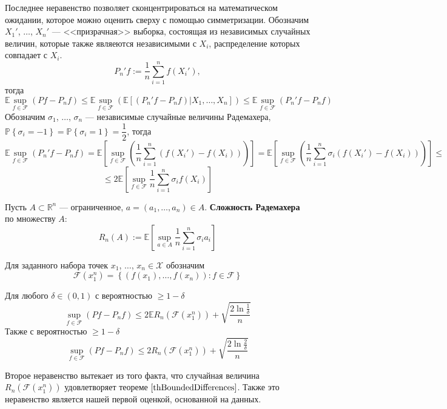 \documentclass[12pt]{article}
\newtheorem{theorem}{\hskip\parindent Теорема}%
\begin{document}
Последнее неравенство позволяет сконцентрироваться на математическом ожидании, которое можно оценить сверху с помощью симметризации. Обозначим $X_1'$, $\dots$, $X_n'$ --- <<призрачная>> выборка, состоящая из независимых случайных величин, которые также являеются независимыми с $X_i$, распределение которых совпадает с $X_i$.
\begin{equation*}
P_n'f:=\frac{1}{n}\sum\limits_{i=1}^{n}f(X_i'),
\end{equation*}
тогда 
\begin{equation*}
\mathbb{E}\sup\limits_{f\in\mathcal{F}}(Pf-P_nf)\leqslant\mathbb{E}\sup\limits_{f\in\mathcal{F}}\left(\mathbb{E}\left[(P_n'f-P_nf)\bigg| X_1,\dots, X_n\right]\right)\leqslant\mathbb{E}\sup\limits_{f\in\mathcal{F}}(P_n'f-P_nf)
\end{equation*}
Обозначим $\sigma_1$, $\dots$, $\sigma_n$ --- независимые случайные величины Радемахера, $\mathbb{P}\left\{\sigma_i=-1\right\}=\mathbb{P}\left\{\sigma_i=1\right\}=\dfrac{1}{2}$, тогда
\begin{equation*}
\mathbb{E}\sup\limits_{f\in\mathcal{F}}(P_n'f-P_nf)=\mathbb{E}\left[\sup\limits_{f\in\mathcal{F}}\left(\frac{1}{n}\sum\limits_{i=1}^{n}(f(X_i')-f(X_i))\right)\right]=\mathbb{E}\left[\sup\limits_{f\in\mathcal{F}}\left(\frac{1}{n}\sum\limits_{i=1}^{n}\sigma_i(f(X_i')-f(X_i))\right)\right]\leqslant
\end{equation*}
\begin{equation*}
\leqslant2\mathbb{E}\left[\sup\limits_{f\in\mathcal{F}}\frac{1}{n}\sum\limits_{i=1}^{n}\sigma_if(X_i)\right]
\end{equation*}

Пусть $A\subset\mathbb{R}^n$ --- ограниченное, $a=(a_1,\dots, a_n)\in A$. \textbf{Сложность Радемахера} по множеству $A$:
\begin{equation*}
R_n(A):=\mathbb{E}\left[\sup\limits_{a\in A}\frac{1}{n}\sum\limits_{i=1}^{n}\sigma_ia_i\right]
\end{equation*}

Для заданного набора точек $x_1$, $\dots$, $x_n\in\mathcal{X}$ обозначим
\begin{equation*}
\mathcal{F}(x_1^n)=\left\{(f(x_1),\dots, f(x_n)): f\in\mathcal{F}\right\}
\end{equation*}
\begin{theorem}
Для любого $\delta\in(0,1)$ с вероятностью $\geqslant1-\delta$
\begin{equation*}
	\sup\limits_{f\in\mathcal{F}}(Pf-P_nf)\leqslant2\mathbb{E}R_n(\mathcal{F}(x_1^n))+\sqrt{\frac{2\ln\frac{1}{\delta}}{n}}
\end{equation*}
Также с вероятностью $\geqslant1-\delta$
\begin{equation}\label{eqFirstDataBasedEstimate}
\sup\limits_{f\in\mathcal{F}}(Pf-P_nf)\leqslant2R_n(\mathcal{F}(x_1^n))+\sqrt{\frac{2\ln\frac{2}{\delta}}{n}}
\end{equation}
\end{theorem}
Второе неравенство вытекает из того факта, что случайная величина $R_n(\mathcal{F}(x_1^n))$ удовлетворяет теореме $\ref{thBoundedDifferences}$. Также это неравенство является нашей первой оценкой, основанной на данных.
\end{document}
